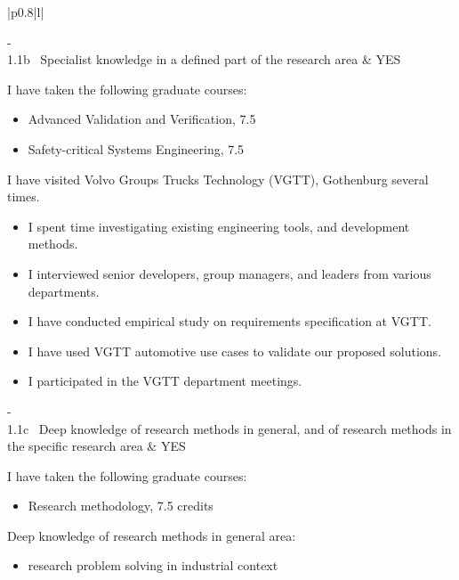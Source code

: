 \begin{longtable}{|p{0.8\linewidth}|l|}
\begin{minipage}{\linewidth}
  \end{minipage}\hfill\vline\kern-\arrayrulewidth\\[2cm]
\hline 1.1b~ Specialist knowledge in a defined part of the research area & YES\\
\hline {}
  \begin{minipage}{\linewidth}\vspace{0.2cm}
  I have taken the following graduate courses:\vspace{-0.2cm}
    \begin{itemize} \itemsep-0.25em
    \item Advanced Validation and Verification, 7.5 
    \item Safety-critical Systems Engineering, 7.5 
    \end{itemize}
   I have visited Volvo Groups Trucks Technology (VGTT), Gothenburg several times.
  \begin{itemize} \itemsep-0.25em
  \item I spent time investigating existing engineering tools, and development methods.
  \item I interviewed senior developers, group managers, and leaders from various departments.
  \item I have conducted empirical study on requirements specification at VGTT.
  \item I have used VGTT automotive use cases to validate our proposed solutions.
  \item I participated in the VGTT department meetings.\\
  \end{itemize}
  \end{minipage}\hfill\vline\kern-\arrayrulewidth\\[2cm]
\hline 1.1c~ Deep knowledge of research methods in general, and of research methods in the specific research area & YES\\
\hline {}
  \begin{minipage}{\linewidth}\vspace{0.2cm}
  I have taken the following graduate courses:\vspace{-0.2cm}
  \begin{itemize} \itemsep-0.25em
    \item Research methodology, 7.5 credits
  \end{itemize}
  Deep knowledge of research methods in general area:
  \begin{itemize} \itemsep-0.25em
  \item research problem solving  in industrial context

\end{itemize}
\end{minipage}
\end{longtable}
